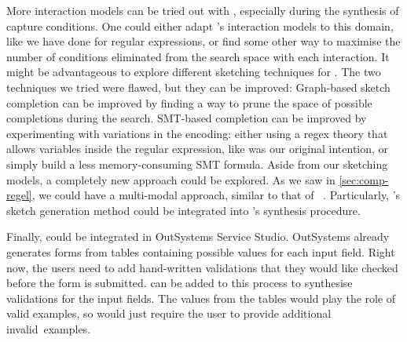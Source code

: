 More interaction models can be tried out with \Forest, especially during the synthesis of capture conditions. One could either adapt \citeauthor{UnchartIt20}'s interaction models to this domain, like we have done for regular expressions, or find some other way to maximise the number of conditions eliminated from the search space with each interaction.
%
It might be advantageous to explore different sketching techniques for \Forest. The two techniques we tried were flawed, but they can be improved: Graph-based sketch completion can be improved by finding a way to prune the space of possible completions during the search. SMT-based completion can be improved by experimenting with variations in the encoding: either using a regex theory that allows variables inside the regular expression, like was our original intention, or simply build a less memory-consuming SMT formula. Aside from our sketching models, a completely new approach could be explored. As we saw in \autoref{sec:comp-regel}, we could have a multi-modal approach, similar to that of \Regel{}~\cite{Regel20}. Particularly, \Regel's sketch generation method could be integrated into \Forest's synthesis procedure.

Finally, \Forest could be integrated in OutSystems Service Studio. OutSystems already generates forms from tables containing possible values for each input field. Right now, the users need to add hand-written validations that they would like checked before the form is submitted. \Forest can be added to this process to synthesise validations for the input fields. The values from the tables would play the role of valid examples, so \Forest would just require the user to provide additional invalid~examples.